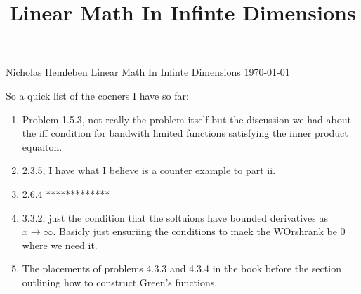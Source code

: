 \documentclass[12pt]{article}
\newcommand{\rw}{\rightarrow}
\theoremstyle{definition}
\begin{document}
\title{Linear Math In Infinte Dimensions}
{\Large Nicholas Hemleben} \hfill
{\large Linear Math In Infinte Dimensions}  
\hfill  \today


So a quick list of the cocners I have so far:
\begin{enumerate}
	\item Problem 1.5.3, not really the problem itself but the discussion we had about the iff condition for bandwith limited functions satisfying the inner product equaiton.
	\item
		2.3.5, I have what I believe is a counter example to part ii.

	\item
		2.6.4  *************\\
	\item
		3.3.2, just the condition that the soltuions have bounded derivatives as $x \rw \infty$. Basicly just ensuriing the conditions to maek the WOrshrank be 0 where we need it.

	\item
		The placements of problems 4.3.3 and 4.3.4 in the book before the section outlining how to construct Green's functions.

\end{enumerate}
\end{document}
